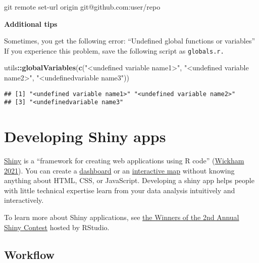 \documentclass[
]{book}
\newenvironment{Shaded}{\begin{snugshade}}{\end{snugshade}}
\newcommand{\FunctionTok}[1]{\textcolor[rgb]{0.00,0.00,0.00}{#1}}
\newcommand{\KeywordTok}[1]{\textcolor[rgb]{0.13,0.29,0.53}{\textbf{#1}}}
\newcommand{\NormalTok}[1]{#1}
\newcommand{\OperatorTok}[1]{\textcolor[rgb]{0.81,0.36,0.00}{\textbf{#1}}}
\newcommand{\StringTok}[1]{\textcolor[rgb]{0.31,0.60,0.02}{#1}}
\begin{document}
\begin{Shaded}
\begin{Highlighting}[]
\FunctionTok{git}\NormalTok{ remote set{-}url origin git@github.com:user/repo }
\end{Highlighting}
\end{Shaded}

\textbf{Additional tips}

Sometimes, you get the following error: ``Undefined global functions or variables'' If you experience this problem, save the following script as \texttt{globals.r.}

\begin{Shaded}
\begin{Highlighting}[]
\NormalTok{utils}\OperatorTok{::}\KeywordTok{globalVariables}\NormalTok{(}\KeywordTok{c}\NormalTok{(}\StringTok{"\textless{}undefined variable name1\textgreater{}"}\NormalTok{, }\StringTok{"\textless{}undefined variable name2\textgreater{}"}\NormalTok{, }\StringTok{"\textless{}undefinedvariable name3"}\NormalTok{))}
\end{Highlighting}
\end{Shaded}

\begin{verbatim}
## [1] "<undefined variable name1>" "<undefined variable name2>"
## [3] "<undefinedvariable name3"
\end{verbatim}

\hypertarget{developing-shiny-apps}{%
\section{Developing Shiny apps}\label{developing-shiny-apps}}

\href{https://shiny.rstudio.com/}{Shiny} is a ``framework for creating web applications using R code'' (\href{https://mastering-shiny.org/}{Wickham 2021}). You can create a \href{https://rstudio.github.io/shinydashboard/}{dashboard} or an \href{https://rviews.rstudio.com/2019/10/09/building-interactive-world-maps-in-shiny/}{interactive map} without knowing anything about HTML, CSS, or JavaScript. Developing a shiny app helps people with little technical expertise learn from your data analysis intuitively and interactively.

To learn more about Shiny applications, see \href{https://blog.rstudio.com/2020/07/13/winners-of-the-2nd-shiny-contest/}{the Winners of the 2nd Annual Shiny Contest} hosted by RStudio.

\hypertarget{workflow-1}{%
\subsection{Workflow}\label{workflow-1}}
\end{document}
